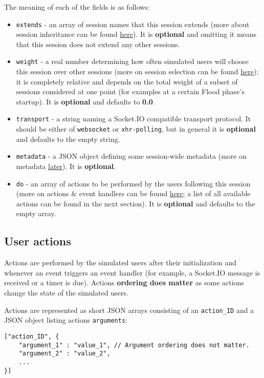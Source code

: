 \documentclass[a4paper]{article}
\begin{document}
\noindent
The meaning of each of the fields is as follows:


\begin{itemize}
\item \texttt{extends} - an array of session names that this session extends (more about session inheritance can be found \hyperref[sec-2-2]{here}). It is \textbf{optional} and omitting it means that this session does not extend any other sessions.
\item \texttt{weight} - a real number determining how often simulated users will choose this session over other sessions (more on session selection can be found \hyperref[sec-2-2]{here}); it is completely relative and depends on the total weight of a subset of sessions considered at one point (for examples at a certain Flood phase's startup). It is \textbf{optional} and defaults to \textbf{0.0}.
\item \texttt{transport} - a string naming a Socket.IO compatible transport protocol. It should be either of \texttt{websocket} or \texttt{xhr-polling}, but in general it is \textbf{optional} and defaults to the empty string.
\item \texttt{metadata} - a JSON object defining some session-wide metadata (more on metadata \hyperref[sec-3-6]{later}). It is \textbf{optional}.
\item \texttt{do} - an array of actions to be performed by the users following this session (more on actions \& event handlers can be found \hyperref[sec-2-2]{here}; a list of all available actions can be found in the next section). It is \textbf{optional} and defaults to the empty array.
\end{itemize}
\subsection{User actions}
\label{sec-3-5}

Actions are performed by the simulated users after their initialization and whenever an event triggers an event handler (for example, a Socket.IO message is received or a timer is due). Actions \textbf{ordering does matter} as some actions change the state of the simulated users.

\noindent
Actions are represented as short JSON arrays consisting of an \texttt{action\_ID} and a JSON object listing actions \texttt{arguments}:


\begin{verbatim}
["action_ID", {
    "argument_1" : "value_1", // Argument ordering does not matter.
    "argument_2" : "value_2",
    ...
}]
\end{verbatim}
\end{document}
